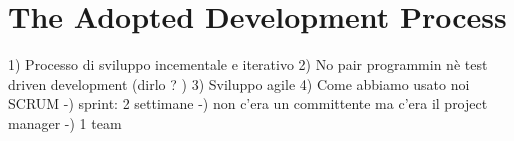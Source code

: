 	
	
	\section{The Adopted Development Process}
		1) Processo di sviluppo incementale e iterativo
		2) No pair programmin nè test driven development  (dirlo ? )
		3) Sviluppo agile
		4) Come abbiamo usato noi SCRUM
			-) sprint: 2 settimane
			-) non c'era un committente ma c'era il project manager
			-) 1 team

\begin{comment}
	\section{SCRUM}

	\section{Working Instruments}
	In addition to ACT-R and OpenCV, many other tools have been used. Here follows a list of the most important ones.
		\begin{itemize}
		\item \textbf{Eclipse IDE for C/C++ Developers} as \textit{integrated development environment} \footnote{More informations at \url{www.eclipse.org}};
		\item \textbf{Cute} as \textit{unit testing framework} \footnote{More informations at \url{http://cute-test.com}};
		\item \textbf{Mylyn} as \textit{task and application lifecycle management} \footnote{More informations at \url{www.eclipse.org/mylyn}};
		\item \textbf{Trac} as \textit{bug tracking system} \footnote{More informations at \url{trac.edgewall.org}};
		\item \textbf{Git} as \textit{version control system} \footnote{More informations at \url{git-scm.com}}; 
		\item \textbf{Dia} and \textbf{cpp2dia} to create UML diagrams \footnote{More informations at \url{dia-installer.de} and at \url{cpp2dia.sourceforge.net}};
		\item \textbf{ZBar} to read QR codes \footnote{More informations at \url{zbar.sourceforge.net}}.
		\end{itemize}
\end{comment}
